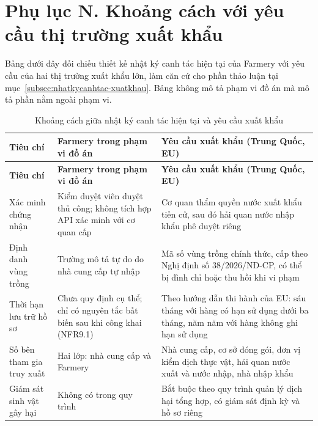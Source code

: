 \section*{Phụ lục N. Khoảng cách với yêu cầu thị trường xuất khẩu}
\label{apdx:xuatkhau}

Bảng dưới đây đối chiếu thiết kế nhật ký canh tác hiện tại của Farmery với yêu cầu của hai thị trường xuất khẩu lớn, làm căn cứ cho phần thảo luận tại mục~\ref{subsec:nhatkycanhtac-xuatkhau}. Bảng không mô tả phạm vi đồ án mà mô tả phần nằm ngoài phạm vi.

\begingroup
\small
\renewcommand{\arraystretch}{1.3}
\begin{longtable}{L{3.0cm} L{5.4cm} L{5.4cm}}
\caption{Khoảng cách giữa nhật ký canh tác hiện tại và yêu cầu xuất khẩu}
\label{tab:khoangcachxuatkhau} \\
\toprule
{}
\textbf{Tiêu chí} & \textbf{Farmery trong phạm vi đồ án} & \textbf{Yêu cầu xuất khẩu (Trung Quốc, EU)} \\
\midrule
\endfirsthead
\toprule
{}
\textbf{Tiêu chí} & \textbf{Farmery trong phạm vi đồ án} & \textbf{Yêu cầu xuất khẩu (Trung Quốc, EU)} \\
\midrule
\endhead
\bottomrule
\endfoot
Xác minh chứng nhận & Kiểm duyệt viên duyệt thủ công; không tích hợp API xác minh với cơ quan cấp & Cơ quan thẩm quyền nước xuất khẩu tiến cử, sau đó hải quan nước nhập khẩu phê duyệt riêng \\
Định danh vùng trồng & Trường mô tả tự do do nhà cung cấp tự nhập & Mã số vùng trồng chính thức, cấp theo Nghị định số 38/2026/NĐ-CP, có thể bị đình chỉ hoặc thu hồi khi vi phạm \\
Thời hạn lưu trữ hồ sơ & Chưa quy định cụ thể; chỉ có nguyên tắc bất biến sau khi công khai (NFR9.1) & Theo hướng dẫn thi hành của EU: sáu tháng với hàng có hạn sử dụng dưới ba tháng, năm năm với hàng không ghi hạn sử dụng \\
Số bên tham gia truy xuất & Hai lớp: nhà cung cấp và Farmery & Nhà cung cấp, cơ sở đóng gói, đơn vị kiểm dịch thực vật, hải quan nước xuất và nước nhập, nhà nhập khẩu \\
Giám sát sinh vật gây hại & Không có trong quy trình & Bắt buộc theo quy trình quản lý dịch hại tổng hợp, có giám sát định kỳ và hồ sơ riêng \\
\end{longtable}
\endgroup

